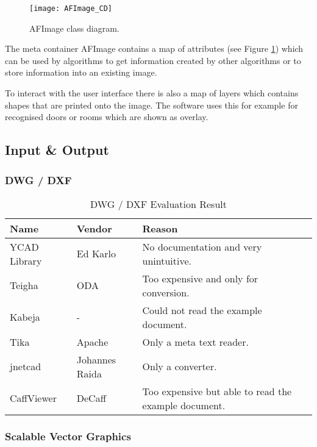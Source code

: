 \begin{figure}[h]
  \centering
      \texttt{[image: AFImage\_CD]}
  \caption{AFImage class diagram.}
  \label{fig:AFImage_CD}
\end{figure}

The meta container AFImage contains a map of attributes (see Figure \ref{fig:AFImage_CD}) which can be used by algorithms to get information created by other algorithms or to store information into an existing image.

To interact with the user interface there is also a map of layers which contains shapes that are printed onto the image. The software uses this for example for recognised doors or rooms which are shown as overlay.

\subsection{Input \& Output}

\subsubsection{DWG / DXF}

\begin{table}[h]
\centering
\caption{DWG / DXF Evaluation Result}
\label{tbl:DWGEvaluationResult}
\begin{tabular}{@{}lll@{}}
\toprule
Name         & Vendor         & Reason                                               \\ \midrule
YCAD Library & Ed Karlo       & No documentation and very unintuitive.                \\
Teigha       & ODA            & Too expensive and only for conversion.               \\
Kabeja       & -              & Could not read the example document.                 \\
Tika         & Apache         & Only a meta text reader.                             \\
jnetcad      & Johannes Raida & Only a converter.                                    \\
CaffViewer   & DeCaff         & Too expensive but able to read the example document. \\ \bottomrule
\end{tabular}
\end{table}



\subsubsection{Scalable Vector Graphics}

